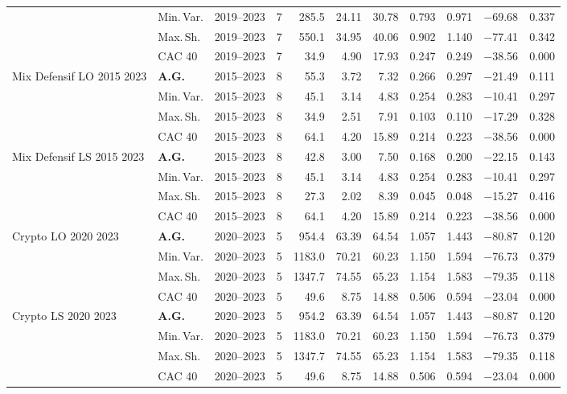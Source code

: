 \begin{longtable}{p{2.6cm} l c c r r r r r r r}
 & Min.\,Var. & 2019--2023 & 7 & 285.5 & 24.11 & 30.78 & 0.793 & 0.971 & $-$69.68 & 0.337 \\
 & Max.\,Sh. & 2019--2023 & 7 & 550.1 & 34.95 & 40.06 & 0.902 & 1.140 & $-$77.41 & 0.342 \\
 & CAC 40 & 2019--2023 & 7 & 34.9 & 4.90 & 17.93 & 0.247 & 0.249 & $-$38.56 & 0.000 \\
\midrule
Mix Defensif LO 2015 2023 & \textbf{A.G.} & 2015--2023 & 8 & 55.3 & 3.72 & 7.32 & 0.266 & 0.297 & $-$21.49 & 0.111 \\
 & Min.\,Var. & 2015--2023 & 8 & 45.1 & 3.14 & 4.83 & 0.254 & 0.283 & $-$10.41 & 0.297 \\
 & Max.\,Sh. & 2015--2023 & 8 & 34.9 & 2.51 & 7.91 & 0.103 & 0.110 & $-$17.29 & 0.328 \\
 & CAC 40 & 2015--2023 & 8 & 64.1 & 4.20 & 15.89 & 0.214 & 0.223 & $-$38.56 & 0.000 \\
\midrule
Mix Defensif LS 2015 2023 & \textbf{A.G.} & 2015--2023 & 8 & 42.8 & 3.00 & 7.50 & 0.168 & 0.200 & $-$22.15 & 0.143 \\
 & Min.\,Var. & 2015--2023 & 8 & 45.1 & 3.14 & 4.83 & 0.254 & 0.283 & $-$10.41 & 0.297 \\
 & Max.\,Sh. & 2015--2023 & 8 & 27.3 & 2.02 & 8.39 & 0.045 & 0.048 & $-$15.27 & 0.416 \\
 & CAC 40 & 2015--2023 & 8 & 64.1 & 4.20 & 15.89 & 0.214 & 0.223 & $-$38.56 & 0.000 \\
\midrule
Crypto LO 2020 2023 & \textbf{A.G.} & 2020--2023 & 5 & 954.4 & 63.39 & 64.54 & 1.057 & 1.443 & $-$80.87 & 0.120 \\
 & Min.\,Var. & 2020--2023 & 5 & 1183.0 & 70.21 & 60.23 & 1.150 & 1.594 & $-$76.73 & 0.379 \\
 & Max.\,Sh. & 2020--2023 & 5 & 1347.7 & 74.55 & 65.23 & 1.154 & 1.583 & $-$79.35 & 0.118 \\
 & CAC 40 & 2020--2023 & 5 & 49.6 & 8.75 & 14.88 & 0.506 & 0.594 & $-$23.04 & 0.000 \\
\midrule
Crypto LS 2020 2023 & \textbf{A.G.} & 2020--2023 & 5 & 954.2 & 63.39 & 64.54 & 1.057 & 1.443 & $-$80.87 & 0.120 \\
 & Min.\,Var. & 2020--2023 & 5 & 1183.0 & 70.21 & 60.23 & 1.150 & 1.594 & $-$76.73 & 0.379 \\
 & Max.\,Sh. & 2020--2023 & 5 & 1347.7 & 74.55 & 65.23 & 1.154 & 1.583 & $-$79.35 & 0.118 \\
 & CAC 40 & 2020--2023 & 5 & 49.6 & 8.75 & 14.88 & 0.506 & 0.594 & $-$23.04 & 0.000 \\

\end{longtable}
